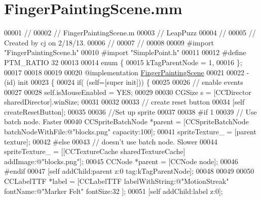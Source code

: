 \hypertarget{_finger_painting_scene_8mm}{\section{Finger\-Painting\-Scene.\-mm}
\label{d4/dd7/_finger_painting_scene_8mm}
}

\begin{DoxyCode}
00001 \textcolor{comment}{//}
00002 \textcolor{comment}{//  FingerPaintingScene.m}
00003 \textcolor{comment}{//  LeapPuzz}
00004 \textcolor{comment}{//}
00005 \textcolor{comment}{//  Created by cj on 2/18/13.}
00006 \textcolor{comment}{//}
00007 \textcolor{comment}{//}
00008 
00009 \textcolor{preprocessor}{#import "FingerPaintingScene.h"}
00010 \textcolor{preprocessor}{#import "SimplePoint.h"}
00011 
00012 \textcolor{preprocessor}{#define PTM\_RATIO 32}
00013 \textcolor{preprocessor}{}
00014 \textcolor{keyword}{enum} \{
00015     kTagParentNode = 1,
00016 \};
00017 
00018 
00019 
00020 \textcolor{keyword}{@implementation }\hyperlink{interface_finger_painting_scene}{FingerPaintingScene}
00021 
00022 -(id) init
00023 \{
00024     \textcolor{keywordflow}{if}( (\textcolor{keyword}{self}=[super init])) \{
00025         
00026         \textcolor{comment}{// enable events}
00027 
00028         \textcolor{keyword}{self}.isMouseEnabled = YES;
00029 
00030         CGSize s = [CCDirector sharedDirector].winSize;
00031         
00032         
00033         \textcolor{comment}{// create reset button}
00034         [\textcolor{keyword}{self} createResetButton];
00035         
00036         \textcolor{comment}{//Set up sprite}
00037         
00038 \textcolor{preprocessor}{#if 1}
00039 \textcolor{preprocessor}{}        \textcolor{comment}{// Use batch node. Faster}
00040         CCSpriteBatchNode *parent = [CCSpriteBatchNode batchNodeWithFile:@"blocks.png" capacity:100];
00041         spriteTexture\_ = [parent texture];
00042 \textcolor{preprocessor}{#else}
00043 \textcolor{preprocessor}{}        \textcolor{comment}{// doesn't use batch node. Slower}
00044         spriteTexture\_ = [[CCTextureCache sharedTextureCache] addImage:@"blocks.png"];
00045         CCNode *parent = [CCNode node];
00046 \textcolor{preprocessor}{#endif}
00047 \textcolor{preprocessor}{}        [\textcolor{keyword}{self} addChild:parent z:0 tag:kTagParentNode];
00048         
00049                 
00050         CCLabelTTF *label = [CCLabelTTF labelWithString:@"MotionStreak" fontName:@"Marker Felt" fontSize:32
      ];
00051         [\textcolor{keyword}{self} addChild:label z:0];

\end{DoxyCode}
